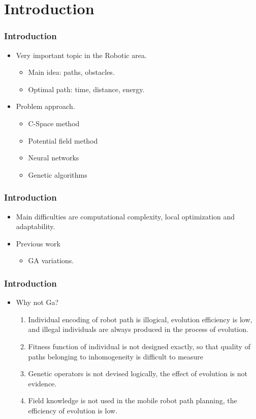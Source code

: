 \section{Introduction}
\frame
{
\frametitle{Introduction}
\begin{itemize}
	\item Very important topic in the Robotic area.
	\begin{itemize}
		\item Main idea: paths, obstacles.
		\item Optimal path: time, distance, energy.
	\end{itemize}
	\item Problem approach.
	\begin{itemize}
		\item C-Space method
		\item Potential field method
		\item Neural networks
		\item Genetic algorithms
	\end{itemize}
\end{itemize}
}

\frame
{
\frametitle{Introduction}
\begin{itemize}
	\item Main difficulties are computational complexity, local optimization and adaptability.
	\item Previous work
	\begin{itemize}
		\item GA variations.
	\end{itemize}
\end{itemize}
}
\frame
{
\frametitle{Introduction}
\begin{itemize}
	\item Why not Ga?
	\begin{enumerate}
		\item Individual encoding of robot path is illogical, evolution efficiency is low, and illegal individuals are always produced in the process of evolution.
		\item Fitness function of individual is not designed exactly, so that quality of paths belonging to inhomogeneity is difficult to measure
		\item Genetic operators is not devised logically, the effect of evolution is not evidence.
		\item Field knowledge is not used in the mobile robot path planning, the efficiency of evolution is low.
	\end{enumerate}
\end{itemize}
}

